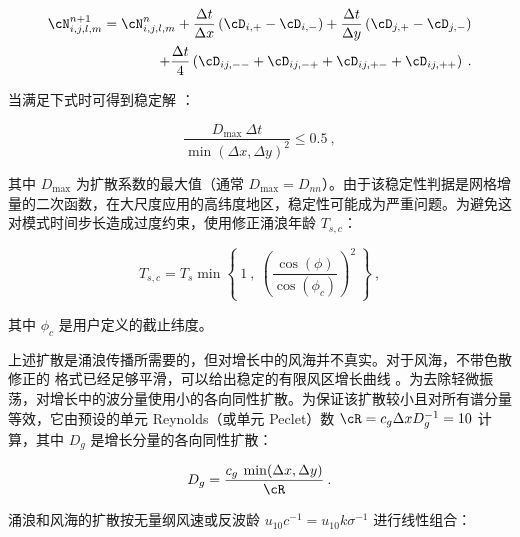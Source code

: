 
\begin{eqnarray}
\cN_{i,j,l,m}^{n+1} = \cN_{i,j,l,m}^n + 
\frac{\Delta t}{\Delta x} 
   \left ( \cD_{i,+} - \cD_{i,-} \right ) +
\frac{\Delta t}{\Delta y}
   \left ( \cD_{j,+} - \cD_{j,-} \right ) \nonumber \\
+ \frac{\Delta t}{4} \left ( \cD_{ij,--} + 
   \cD_{ij,-+} + \cD_{ij,+-} + \cD_{ij,++} \right )
\: . \label{eq:ddif_3} \end{eqnarray}

\noindent
当满足下式时可得到稳定解 \citep[e.g.,][Part I section 7.1.1]{bk:Fle88}：


\begin{equation}
\frac{D_{\max} \: \Delta t}{\min(\Delta x , \Delta y)^2}
\leq 0.5 \: , \label{eq:ddif_4} \end{equation}

\noindent
其中 $D_{\max}$ 为扩散系数的最大值（通常 $D_{\max} = D_{nn}$）。由于该稳定性判据是网格增量的二次函数，在大尺度应用的高纬度地区，稳定性可能成为严重问题。为避免这对模式时间步长造成过度约束，使用修正涌浪年龄 $T_{s,c}$：


\begin{equation}
T_{s,c} = T_s \min \left \{ \: 1 \: , \: 
\left ( \frac{\cos(\phi)}{\cos(\phi_c)} \right )^2 \: \right \}
\: , \label{eq:Ts_cor} \end{equation}

\noindent
其中 $\phi_c$ 是用户定义的截止纬度。

\vspace{\baselineskip} \noindent
 
上述扩散是涌浪传播所需要的，但对增长中的风海并不真实。对于风海，不带色散修正的 \uq{} 格式已经足够平滑，可以给出稳定的有限风区增长曲线 \citep{tol:OMB95}。为去除轻微振荡，对增长中的波分量使用小的各向同性扩散。为保证该扩散较小且对所有谱分量等效，它由预设的单元 Reynolds（或单元 Peclet）数 $\cR = c_g \Delta x D_g^{-1} = 10$ 计算，其中 $D_g$ 是增长分量的各向同性扩散：


\begin{equation}
D_g = \frac{c_g \: \min(\Delta x , \Delta y)}{\cR} \: . \label{eq:Dg}
 \end{equation}

\noindent
涌浪和风海的扩散按无量纲风速或反波龄 $u_{10} c^{-1} = u_{10} k \sigma^{-1}$ 进行线性组合：

